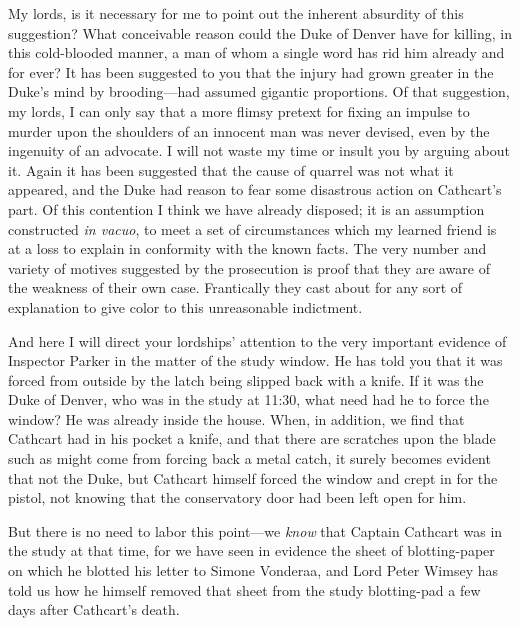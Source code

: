 \begin{dialogue}
My lords, is it necessary for me to point out the inherent absurdity of this suggestion? What conceivable reason could the Duke of Denver have for killing, in this cold-blooded manner, a man of whom a single word has rid him already and for ever? It has been suggested to you that the injury had grown greater in the Duke's mind by brooding\allowbreak---\allowbreak had assumed gigantic proportions. Of that suggestion, my lords, I can only say that a more flimsy pretext for fixing an impulse to murder upon the shoulders of an innocent man was never devised, even by the ingenuity of an advocate. I will not waste my time or insult you by arguing about it. Again it has been suggested that the cause of quarrel was not what it appeared, and the Duke had reason to fear some disastrous action on Cathcart's part. Of this contention I think we have already disposed; it is an assumption constructed \textit{in vacuo}, to meet a set of circumstances which my learned friend is at a loss to explain in conformity with the known facts. The very number and variety of motives suggested by the prosecution is proof that they are aware of the weakness of their own case. Frantically they cast about for any sort of explanation to give color to this unreasonable indictment.

\smallskip 

And here I will direct your lordships' attention to the very important evidence of Inspector Parker in the matter of the study window. He has told you that it was forced from outside by the latch being slipped back with a knife. If it was the Duke of Denver, who was in the study at 11:30, what need had he to force the window? He was already inside the house. When, in addition, we find that Cathcart had in his pocket a knife, and that there are scratches upon the blade such as might come from forcing back a metal catch, it surely becomes evident that not the Duke, but Cathcart himself forced the window and crept in for the pistol, not knowing that the conservatory door had been left open for him.

\smallskip 

But there is no need to labor this point\allowbreak---\allowbreak we \textit{know} that Captain Cathcart was in the study at that time, for we have seen in evidence the sheet of blotting-paper on which he blotted his letter to Simone Vonderaa, and Lord Peter Wimsey has told us how he himself removed that sheet from the study blotting-pad a few days after Cathcart's death.

\smallskip 


\end{dialogue}
